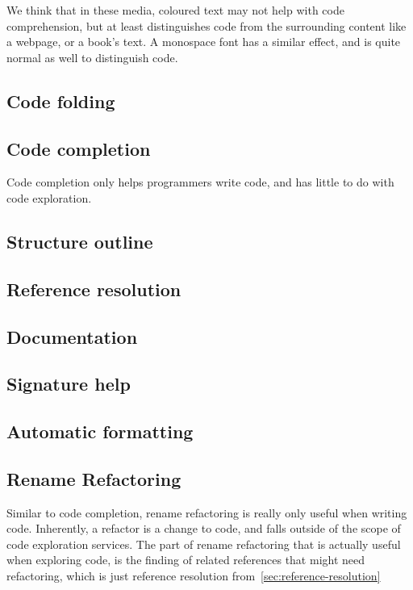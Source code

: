 We think that in these media, coloured text may not help with code comprehension, but at least
distinguishes code from the surrounding content like a webpage, or a book's text.
A monospace font has a similar effect, and is quite normal as well to distinguish code.

\subsection*{Code folding}

\subsection*{Code completion}

Code completion only helps programmers write code, and has little to do with code exploration.

\subsection*{Structure outline}

\subsection*{Reference resolution}
\label{sec:reference-resolution}

\subsection*{Documentation}

\subsection*{Signature help}

\subsection*{Automatic formatting}

\subsection*{Rename Refactoring}

Similar to code completion, rename refactoring is really only useful when writing code.
Inherently, a refactor is a change to code, and falls outside of the scope of code exploration services.
The part of rename refactoring that is actually useful when exploring code, is the finding of related references that might
need refactoring, which is just reference resolution from~\ref{sec:reference-resolution} 

